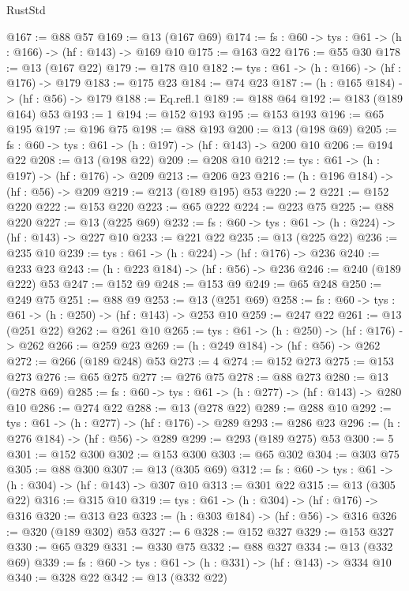 \begin{lexlean}{RustStd}
\begin{coremodule}
@167 := @88 @57
@169 := @13 (@167 @69)
@174 := {fs : @60} -> {tys : @61} -> (h : @166) -> (hf : @143) -> @169 @10
@175 := @163 @22
@176 := @55 @30
@178 := @13 (@167 @22)
@179 := @178 @10
@182 := {tys : @61} -> (h : @166) -> (hf : @176) -> @179
@183 := @175 @23
@184 := @74 @23
@187 := (h : @165 @184) -> (hf : @56) -> @179
@188 := Eq.refl.{1}
@189 := @188 @64
@192 := @183 (@189 @164) @53
@193 := 1
@194 := @152 @193
@195 := @153 @193
@196 := @65 @195
@197 := @196 @75
@198 := @88 @193
@200 := @13 (@198 @69)
@205 := {fs : @60} -> {tys : @61} -> (h : @197) -> (hf : @143) -> @200 @10
@206 := @194 @22
@208 := @13 (@198 @22)
@209 := @208 @10
@212 := {tys : @61} -> (h : @197) -> (hf : @176) -> @209
@213 := @206 @23
@216 := (h : @196 @184) -> (hf : @56) -> @209
@219 := @213 (@189 @195) @53
@220 := 2
@221 := @152 @220
@222 := @153 @220
@223 := @65 @222
@224 := @223 @75
@225 := @88 @220
@227 := @13 (@225 @69)
@232 := {fs : @60} -> {tys : @61} -> (h : @224) -> (hf : @143) -> @227 @10
@233 := @221 @22
@235 := @13 (@225 @22)
@236 := @235 @10
@239 := {tys : @61} -> (h : @224) -> (hf : @176) -> @236
@240 := @233 @23
@243 := (h : @223 @184) -> (hf : @56) -> @236
@246 := @240 (@189 @222) @53
@247 := @152 @9
@248 := @153 @9
@249 := @65 @248
@250 := @249 @75
@251 := @88 @9
@253 := @13 (@251 @69)
@258 := {fs : @60} -> {tys : @61} -> (h : @250) -> (hf : @143) -> @253 @10
@259 := @247 @22
@261 := @13 (@251 @22)
@262 := @261 @10
@265 := {tys : @61} -> (h : @250) -> (hf : @176) -> @262
@266 := @259 @23
@269 := (h : @249 @184) -> (hf : @56) -> @262
@272 := @266 (@189 @248) @53
@273 := 4
@274 := @152 @273
@275 := @153 @273
@276 := @65 @275
@277 := @276 @75
@278 := @88 @273
@280 := @13 (@278 @69)
@285 := {fs : @60} -> {tys : @61} -> (h : @277) -> (hf : @143) -> @280 @10
@286 := @274 @22
@288 := @13 (@278 @22)
@289 := @288 @10
@292 := {tys : @61} -> (h : @277) -> (hf : @176) -> @289
@293 := @286 @23
@296 := (h : @276 @184) -> (hf : @56) -> @289
@299 := @293 (@189 @275) @53
@300 := 5
@301 := @152 @300
@302 := @153 @300
@303 := @65 @302
@304 := @303 @75
@305 := @88 @300
@307 := @13 (@305 @69)
@312 := {fs : @60} -> {tys : @61} -> (h : @304) -> (hf : @143) -> @307 @10
@313 := @301 @22
@315 := @13 (@305 @22)
@316 := @315 @10
@319 := {tys : @61} -> (h : @304) -> (hf : @176) -> @316
@320 := @313 @23
@323 := (h : @303 @184) -> (hf : @56) -> @316
@326 := @320 (@189 @302) @53
@327 := 6
@328 := @152 @327
@329 := @153 @327
@330 := @65 @329
@331 := @330 @75
@332 := @88 @327
@334 := @13 (@332 @69)
@339 := {fs : @60} -> {tys : @61} -> (h : @331) -> (hf : @143) -> @334 @10
@340 := @328 @22
@342 := @13 (@332 @22)

\end{coremodule}
\end{lexlean}
